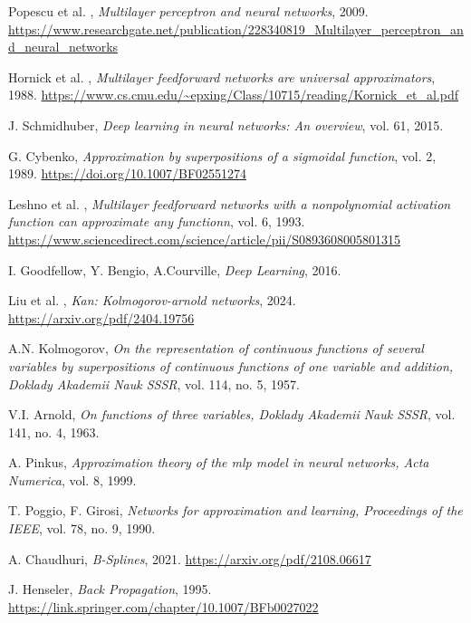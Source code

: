 \documentclass[a4paper,12pt]{report}
\begin{document}
	\begin{thebibliography}{99}
		Popescu et al. , \emph{Multilayer perceptron and neural networks}, 2009. \url{https://www.researchgate.net/publication/228340819_Multilayer_perceptron_and_neural_networks}
		
		Hornick et al. , \emph{Multilayer feedforward networks are universal approximators}, 1988. \url{https://www.cs.cmu.edu/~epxing/Class/10715/reading/Kornick_et_al.pdf}
		
		J. Schmidhuber, \emph{Deep learning in neural networks: An overview}, vol. 61, 2015.
		
		G. Cybenko, \emph{Approximation by superpositions of a sigmoidal function}, vol. 2, 1989. \url{https://doi.org/10.1007/BF02551274}
		
		Leshno et al. , \emph{Multilayer feedforward networks with a nonpolynomial activation function can approximate any functionn}, vol. 6, 1993. \url{https://www.sciencedirect.com/science/article/pii/S0893608005801315}
		
		I. Goodfellow, Y. Bengio, A.Courville, \emph{Deep Learning}, 2016.
		
		Liu et al. , \emph{Kan: Kolmogorov-arnold networks}, 2024. \url{https://arxiv.org/pdf/2404.19756}
		
		A.N. Kolmogorov, \emph{On the representation of continuous functions of several variables by superpositions of continuous functions of one variable and addition, Doklady Akademii Nauk SSSR}, vol. 114, no. 5, 1957.
		
		V.I. Arnold, \emph{On functions of three variables, Doklady Akademii Nauk SSSR}, vol. 141, no. 4, 1963.
		
		A. Pinkus, \emph{Approximation theory of the mlp model in neural networks, Acta Numerica}, vol. 8, 1999.
		
		T. Poggio, F. Girosi, \emph{Networks for approximation and learning, Proceedings of the IEEE}, vol. 78, no. 9, 1990.
		
		A. Chaudhuri, \emph{B-Splines}, 2021. \url{https://arxiv.org/pdf/2108.06617}
		
		J. Henseler, \emph{Back Propagation}, 1995. \url{https://link.springer.com/chapter/10.1007/BFb0027022}
		

\end{thebibliography}
\end{document}

